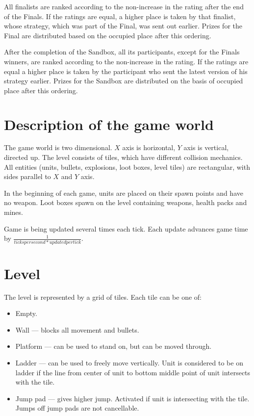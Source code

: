 All finalists are ranked according to the non-increase in the rating after the end of the Finals. If the ratings are equal, a higher place is taken by that finalist, whose strategy, which was part of the Final, was sent out earlier. Prizes for the Final are distributed based on the occupied place after this
ordering.

After the completion of the Sandbox, all its participants, except for the Finals winners, are ranked according to the non-increase in the rating. If the ratings are equal 
a higher place is taken by the participant who sent the latest version of his strategy earlier. Prizes for the Sandbox are distributed on the basis of
occupied place after this ordering.

\section{Description of the game world}

The game world is two dimensional.
$X$ axis is horizontal, $Y$ axis is vertical, directed up.
The level consists of tiles, which have different collision mechanics.
All entities (units, bullets, explosions, loot boxes, level tiles) are rectangular, with sides parallel to $X$ and $Y$ axis.

In the beginning of each game, units are placed on their spawn points and have no weapon.
Loot boxes spawn on the level containing weapons, health packs and mines.

Game is being updated several times each tick.
Each update advances game time by $\frac{1}{ticks per second * updated per tick}$.

\section{Level}

The level is represented by a grid of tiles. Each tile can be one of:
\begin{itemize}
      \item Empty.
      \item Wall --- blocks all movement and bullets.
      \item Platform --- can be used to stand on, but can be moved through.
      \item Ladder --- can be used to freely move vertically.
            Unit is considered to be on ladder if the line from center of unit to bottom middle point of unit intersects with the tile.
      \item Jump pad --- gives higher jump. Activated if unit is intersecting with the tile.
            Jumps off jump pads are not cancellable.
\end{itemize}

